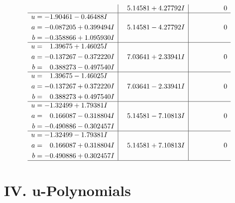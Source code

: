 \documentclass[1p]{elsarticle_modified}
\theoremstyle{definition}
\begin{document}
$$\begin{array}{c|c|c}
 & \phantom{-}5.14581 + 4.27792 I & \phantom{-0.000000 } 0 \\ \hline\begin{aligned}
u &= -1.90461 - 0.46488 I \\
a &= -0.087205 + 0.399494 I \\
b &= -0.358866 + 1.095930 I\end{aligned}
 & \phantom{-}5.14581 - 4.27792 I & \phantom{-0.000000 } 0 \\ \hline\begin{aligned}
u &= \phantom{-}1.39675 + 1.46025 I \\
a &= -0.137267 - 0.372220 I \\
b &= \phantom{-}0.388273 - 0.497540 I\end{aligned}
 & \phantom{-}7.03641 + 2.33941 I & \phantom{-0.000000 } 0 \\ \hline\begin{aligned}
u &= \phantom{-}1.39675 - 1.46025 I \\
a &= -0.137267 + 0.372220 I \\
b &= \phantom{-}0.388273 + 0.497540 I\end{aligned}
 & \phantom{-}7.03641 - 2.33941 I & \phantom{-0.000000 } 0 \\ \hline\begin{aligned}
u &= -1.32499 + 1.79381 I \\
a &= \phantom{-}0.166087 - 0.318804 I \\
b &= -0.490886 - 0.302457 I\end{aligned}
 & \phantom{-}5.14581 - 7.10813 I & \phantom{-0.000000 } 0 \\ \hline\begin{aligned}
u &= -1.32499 - 1.79381 I \\
a &= \phantom{-}0.166087 + 0.318804 I \\
b &= -0.490886 + 0.302457 I\end{aligned}
 & \phantom{-}5.14581 + 7.10813 I & \phantom{-0.000000 } 0\\
 \hline 
 \end{array}$$\newpage
\newpage\renewcommand{\arraystretch}{1}
\centering \section*{ IV. u-Polynomials}
\end{document}
